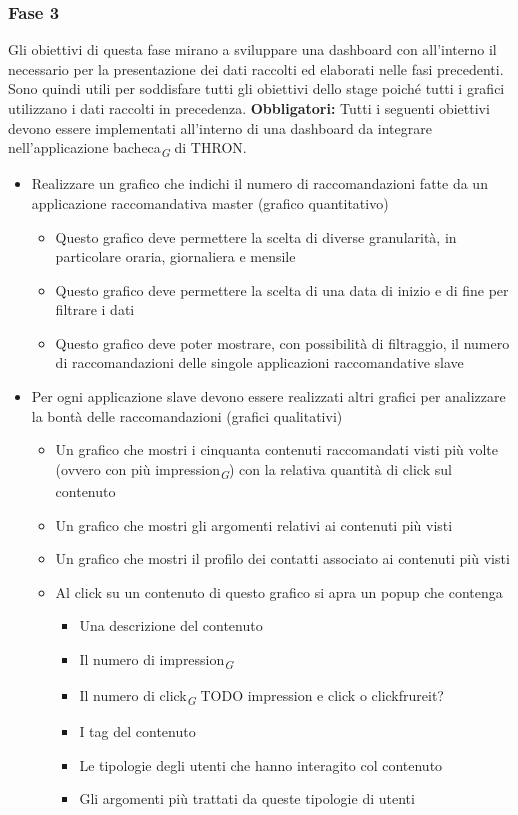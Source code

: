 \documentclass[a4paper, 12pt, twoside, openright]{book}
\newcommand{\gloss}[1]{#1\textsubscript{\textit{\tiny{G}}}}
\begin{document}
\subsubsection{Fase 3}
Gli obiettivi di questa fase mirano a sviluppare una dashboard con all'interno il necessario per la presentazione dei dati raccolti ed elaborati nelle fasi precedenti.\\ Sono quindi utili per soddisfare tutti gli obiettivi dello stage poiché tutti i grafici utilizzano i dati raccolti in precedenza.
\textbf{Obbligatori:}
Tutti i seguenti obiettivi devono essere implementati all'interno di una dashboard da integrare nell'applicazione \gloss{bacheca} di THRON.
\begin{itemize}
	\item Realizzare un grafico che indichi il numero di raccomandazioni fatte da un applicazione raccomandativa master (grafico quantitativo)
	\begin{itemize}
		\item Questo grafico deve permettere la scelta di diverse granularità, in particolare oraria, giornaliera e mensile
		\item Questo grafico deve permettere la scelta di una data di inizio e di fine per filtrare i dati
		\item Questo grafico deve poter mostrare, con possibilità di filtraggio, il numero di raccomandazioni delle singole applicazioni raccomandative slave
	\end{itemize}
	
	\item Per ogni applicazione slave devono essere realizzati altri grafici per analizzare la bontà delle raccomandazioni (grafici qualitativi)
	\begin{itemize}
		\item Un grafico che mostri i cinquanta contenuti raccomandati visti più volte (ovvero con più \gloss{impression}) con la relativa quantità di click sul contenuto 
		\item Un grafico che mostri gli argomenti relativi ai contenuti più visti
		\item Un grafico che mostri il profilo dei contatti associato ai contenuti più visti
		
		\item Al click su un contenuto di questo grafico si apra un popup che contenga 
		\begin{itemize}
			\item Una descrizione del contenuto
			\item Il numero di \gloss{impression}
			\item Il numero di \gloss{click} TODO impression e click o clickfrureit?
			\item I tag del contenuto
			\item Le tipologie degli utenti che hanno interagito col contenuto
			\item Gli argomenti più trattati da queste tipologie di utenti
		\end{itemize} 
	\end{itemize}


\end{itemize}
\end{document}

